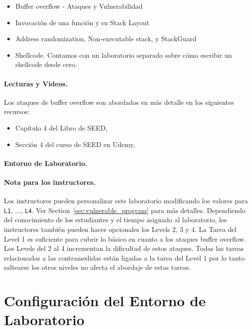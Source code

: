 \begin{itemize}[noitemsep]
\item Buffer overflow - Ataques y Vulnerabilidad
\item Invocación de una función y su Stack Layout
\item Address randomization, Non-executable stack, y StackGuard
\item Shellcode. Contamos con un laboratorio separado sobre cómo escribir un shellcode desde cero.
\end{itemize}



\paragraph{Lecturas y Videos.}
Los ataques de buffer overflow son abordados en más detalle en los siguientes recursos:

\begin{itemize}
\item Capítulo 4 del Libro de SEED, \seedbook
\item Sección 4 del curso de SEED en Udemy, \seedcsvideo
\end{itemize}


\paragraph{Entorno de Laboratorio.} \seedenvironmentC


\paragraph{Nota para los instructores.}
Los instructores pueden personalizar este laboratorio modificando los valores para \texttt{L1}, ..., \texttt{L4}. Ver Section~\ref{sec:vulnerable_program} para más detalles.
Dependiendo del conocimiento de los estudiantes y el tiempo asignado al laboratorio, los instructores también pueden hacer opcionales los Levels 2, 3 y 4.
La Tarea del Level 1 es suficiente para cubrir lo básico en cuanto a los ataques buffer overflow. Los Levels del 2 al 4 incrementan la dificultad de estos ataques.
Todas las tareas relacionadas a las contramedidas están ligadas a la tarea del Level 1 por lo tanto saltearse los otros niveles no afecta el abordaje de estas tareas.


\section{Configuración del Entorno de Laboratorio} 

